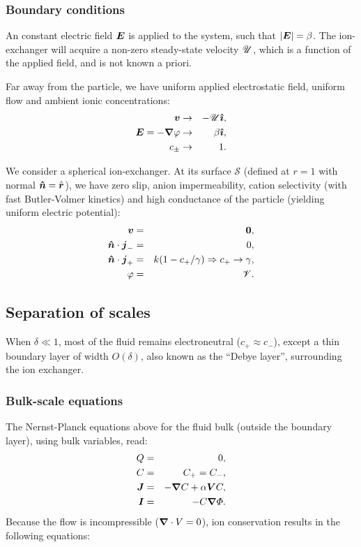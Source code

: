 \subsubsection{Boundary conditions}
An constant electric field $\boldsymbol{E}$ is applied to the system, such that $|\boldsymbol{E}| = \beta$.
The ion-exchanger will acquire a non-zero steady-state velocity $\mathscr{U}$, which is
a function of the applied field, and is not known a priori.

Far away from the particle, we have uniform applied electrostatic field, uniform flow 
and ambient ionic concentrations:
\begin{eqnarray}
\boldsymbol{v} &\rightarrow& -\mathscr{U} \boldsymbol{\hat{\imath}}, \\
\boldsymbol{E} = -\boldsymbol{\nabla} \varphi &\rightarrow& \beta\boldsymbol{\hat{\imath}}, \\
c_\pm &\rightarrow& 1.
\end{eqnarray}

We consider a spherical ion-exchanger. 
At its surface $\mathcal{S}$ (defined at $r=1$ with normal $\boldsymbol{\hat{n}} = \hat{\boldsymbol{r}}$), 
we have zero slip, anion impermeability, cation selectivity (with fast Butler-Volmer kinetics)
and high conductance of the particle (yielding uniform electric potential):
\begin{eqnarray}
\boldsymbol{v} & = & \boldsymbol{0}, \\
\boldsymbol{\hat{n}} \cdot \boldsymbol{j}_- & = & 0, \\
\boldsymbol{\hat{n}} \cdot \boldsymbol{j}_+ & = & k (1 - c_+/\gamma) \Rightarrow c_+ \rightarrow \gamma, \\
\varphi & = & \mathscr{V}.
\end{eqnarray}

\subsection{Separation of scales}
When $\delta \ll 1$, 
most of the fluid remains electroneutral ($c_+ \approx c_-$), 
except a thin boundary layer of width $O(\delta)$, 
also known as the ``Debye layer'', surrounding the ion exchanger. 

\subsubsection  {Bulk-scale equations}
The Nernst-Planck equations above for the fluid bulk (outside
the boundary layer), using bulk variables, read:
\begin{eqnarray}
  Q & = & 0, \\
  C & = & C_+ = C_-, \\
\boldsymbol{J} &=& -\boldsymbol{\nabla} C + \alpha \boldsymbol{V} C, \\
\boldsymbol{I} &=& -C \boldsymbol{\nabla} \varPhi.
\end{eqnarray}
Because the flow is incompressible ($\boldsymbol{\nabla} \cdot V = 0$), 
ion conservation results in the following equations:

